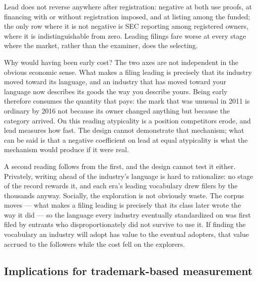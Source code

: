 Lead does not reverse anywhere after registration: negative at both use
proofs, at financing with or without registration imposed, and at listing
among the funded; the only row where it is not negative is SEC reporting
among registered owners, where it is indistinguishable from zero. Leading
filings fare worse at every stage where the market, rather than the
examiner, does the selecting.

Why would having been early cost? The two axes are not independent in the
obvious economic sense. What makes a filing leading is precisely that its
industry moved toward its language, and an industry that has moved toward
your language now describes its goods the way you describe yours. Being
early therefore consumes the quantity that pays: the mark that was
unusual in 2011 is ordinary by 2016 not because its owner changed
anything but because the category arrived. On this reading atypicality is
a position competitors erode, and lead measures how fast. The design
cannot demonstrate that mechanism; what can be said is that a negative
coefficient on lead at equal atypicality is what the mechanism would
produce if it were real.

A second reading follows from the first, and the design cannot test it
either. Privately, writing ahead of the industry's language is hard to
rationalize: no stage of the record rewards it, and each era's leading
vocabulary drew filers by the thousands anyway. Socially, the
exploration is not obviously waste. The corpus moves --- what makes a
filing leading is precisely that its class later wrote the way it did
--- so the language every industry eventually standardized on was first
filed by entrants who disproportionately did not survive to use it. If
finding the vocabulary an industry will adopt has value to the eventual
adopters, that value accrued to the followers while the cost fell on the
explorers.

\subsection{Implications for trademark-based measurement}\label{sec:implications}

